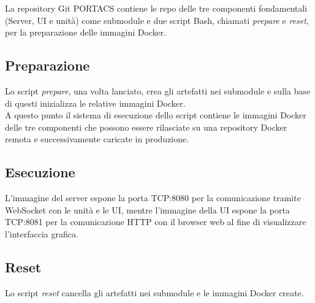 La repository Git PORTACS contiene le repo delle tre componenti fondamentali (Server, UI e unità) come submodule e due script Bash, chiamati \textit{prepare} e \textit{reset}, per la preparazione delle immagini Docker.

\subsection{Preparazione}
Lo script \textit{prepare}, una volta lanciato, crea gli artefatti nei submodule e sulla base di questi inizializza le relative immagini Docker.
\\A questo punto il sistema di esecuzione dello script contiene le immagini Docker delle tre componenti che possono essere rilasciate su una repository Docker remota e successivamente caricate in produzione.

\subsection{Esecuzione}
L'immagine del server espone la porta TCP:8080 per la comunicazione tramite WebSocket con le unità e le UI, mentre l'immagine della UI espone la porta TCP:8081 per la comunicazione HTTP con il browser web al fine di visualizzare l'interfaccia grafica.

\subsection{Reset}
Lo script \textit{reset} cancella gli artefatti nei submodule e le immagini Docker create.